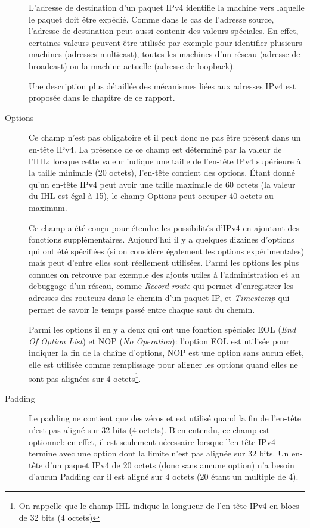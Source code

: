 \begin{description}
L'adresse de destination d'un paquet IPv4 identifie la machine vers
laquelle le paquet doit être expédié. Comme dans le cas de l'adresse source,
 l'adresse de destination peut aussi contenir des valeurs spéciales. En effet, certaines 
valeurs peuvent être utilisée par exemple pour identifier plusieurs machines
(adresses multicast), toutes les machines d'un réseau (adresse de broadcast) ou
la machine actuelle (adresse de loopback).

Une description plus détaillée des mécanismes liées aux adresses IPv4 est
proposée dans le chapitre  
de ce rapport.


\item [Options] 
Ce champ n'est pas obligatoire et il peut donc ne pas être présent dans un
en-tête IPv4. La présence de ce champ est déterminé par la valeur de
l'IHL: lorsque cette valeur indique une taille de l'en-tête IPv4 supérieure à 
la taille minimale (20 octets), l'en-tête contient des options.
Étant donné qu'un en-tête IPv4 peut avoir une taille maximale de 
60 octets (la valeur du IHL est égal à 15), le champ Options peut occuper
40 octets au maximum.

Ce champ a été conçu pour étendre les possibilités d'IPv4 en ajoutant des fonctions
supplémentaires.  Aujourd'hui il y a quelques dizaines d'options qui ont été
spécifiées\cite{url-optsIPv4} (si on considère également les options expérimentales)
mais peut d'entre elles sont réellement utilisées. Parmi les options les plus connues
on retrouve par exemple des ajouts utiles à l'administration et au debuggage
d'un réseau, comme {\it Record route} qui permet d'enregistrer les adresses
des routeurs dans le chemin d'un paquet IP, et {\it Timestamp} qui permet de
savoir le temps passé entre chaque saut du chemin.

Parmi les options il en y a deux qui ont une fonction spéciale: EOL 
({\it End Of Option List}) et NOP ({\it No Operation}): l'option EOL 
est utilisée pour indiquer la fin de la chaîne d'options, NOP est une option
sans aucun effet, elle est utilisée comme remplissage pour aligner les options 
quand elles ne sont pas alignées sur 4 octets\footnote {On rappelle que 
le champ IHL indique la longueur de l'en-tête IPv4 en blocs de 32 bits 
(4 octets)}.



\item [Padding] 
Le padding ne contient que des zéros et est utilisé quand la fin de l'en-tête
n'est pas aligné sur 32 bits (4 octets). Bien entendu, ce champ est optionnel:
en effet, il est seulement nécessaire lorsque l'en-tête IPv4 termine avec
une option dont la limite n'est pas alignée sur 32 bits. Un en-tête d'un paquet IPv4 
de 20 octets (donc sans aucune option) n'a besoin d'aucun Padding car il est aligné sur
4 octets (20 étant un multiple de 4).
\end{description}

